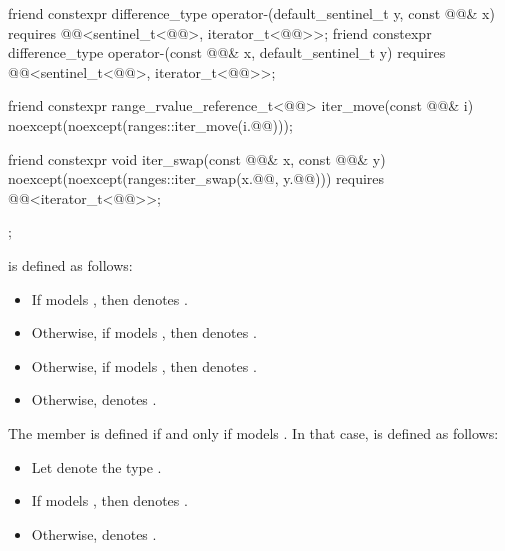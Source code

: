 \begin{codeblock}
{{    friend constexpr difference_type operator-(default_sentinel_t y, const @@& x)
      requires @@<sentinel_t<@@>, iterator_t<@@>>;
    friend constexpr difference_type operator-(const @@& x, default_sentinel_t y)
      requires @@<sentinel_t<@@>, iterator_t<@@>>;

    friend constexpr range_rvalue_reference_t<@@> iter_move(const @@& i)
      noexcept(noexcept(ranges::iter_move(i.@@)));

    friend constexpr void iter_swap(const @@& x, const @@& y)
      noexcept(noexcept(ranges::iter_swap(x.@@, y.@@)))
      requires @@<iterator_t<@@>>;
  };
}
\end{codeblock}

\pnum
{} is defined as follows:
\begin{itemize}
\item
If  models ,
then  denotes .
\item
Otherwise, if  models ,
then  denotes .
\item
Otherwise, if  models ,
then  denotes .
\item
Otherwise,  denotes .
\end{itemize}

\pnum
The member   is defined
if and only if  models .
In that case,
 is defined as follows:
\begin{itemize}
\item
Let  denote
the type .
\item
If  models
,
then  denotes .
\item
Otherwise,  denotes .
\end{itemize}

